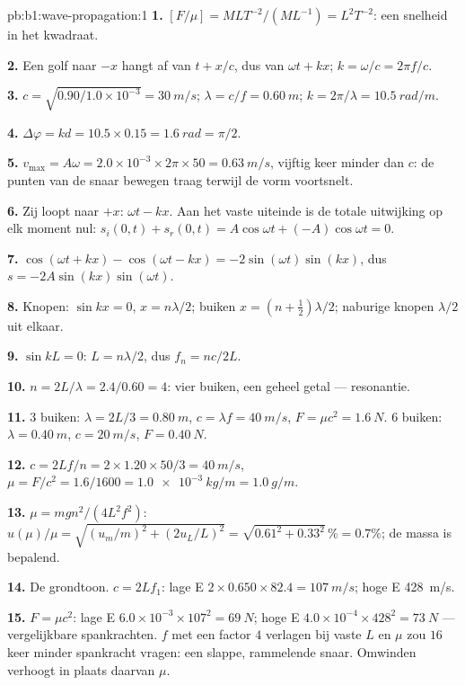 \begin{solution}{pb:b1:wave-propagation:1}
\textbf{1.} $[F/\mu] = M L T^{-2}/(M L^{-1}) = L^2 T^{-2}$: een snelheid in
het kwadraat.

\textbf{2.} Een golf naar $-x$ hangt af van $t + x/c$, dus van
$\omega t + kx$; $k = \omega/c = 2\pi f/c$.

\textbf{3.} $c = \sqrt{0.90/1.0\times10^{-3}} = \qty{30}{m/s}$;
$\lambda = c/f = \qty{0.60}{m}$; $k = 2\pi/\lambda = \qty{10.5}{rad/m}$.

\textbf{4.} $\Delta\varphi = kd = 10.5 \times 0.15 = \qty{1.6}{rad} = \pi/2$.

\textbf{5.} $v_{\max} = A\omega = 2.0\times10^{-3} \times 2\pi \times 50 =
\qty{0.63}{m/s}$, vijftig keer minder dan $c$: de punten van de snaar bewegen
traag terwijl de vorm voortsnelt.

\textbf{6.} Zij loopt naar $+x$:  $\omega t - kx$. Aan het vaste
uiteinde is de totale uitwijking op elk moment nul: $s_i(0, t) + s_r(0, t)
= A\cos\omega t + (-A)\cos\omega t = 0$.

\textbf{7.} $\cos(\omega t + kx) - \cos(\omega t - kx) =
-2\sin(\omega t)\sin(kx)$, dus $s = -2A\sin(kx)\sin(\omega t)$.

\textbf{8.} Knopen: $\sin kx = 0$, $x = n\lambda/2$; buiken $x = (n +
\tfrac12)\lambda/2$; naburige knopen $\lambda/2$ uit elkaar.

\textbf{9.} $\sin kL = 0$: $L = n\lambda/2$, dus $f_n = nc/2L$.

\textbf{10.} $n = 2L/\lambda = 2.4/0.60 = 4$: vier buiken, een geheel getal
--- resonantie.

\textbf{11.} $3$ buiken: $\lambda = 2L/3 = \qty{0.80}{m}$, $c = \lambda f
= \qty{40}{m/s}$, $F = \mu c^2 = \qty{1.6}{N}$. $6$ buiken: $\lambda =
\qty{0.40}{m}$, $c = \qty{20}{m/s}$, $F = \qty{0.40}{N}$.

\textbf{12.} $c = 2Lf/n = 2 \times 1.20 \times 50/3 = \qty{40}{m/s}$,
$\mu = F/c^2 = 1.6/1600 = \qty{1.0e-3}{kg/m} = \qty{1.0}{g/m}$.

\textbf{13.} $\mu = mgn^2/(4L^2f^2)$: $u(\mu)/\mu = \sqrt{(u_m/m)^2 +
(2u_L/L)^2} = \sqrt{0.61^2 + 0.33^2}\,\% = 0.7\%$; de massa is bepalend.

\textbf{14.} De grondtoon. $c = 2Lf_1$: lage E $2 \times 0.650 \times
82.4 = \qty{107}{m/s}$; hoge E \qty{428}{m/s}.

\textbf{15.} $F = \mu c^2$: lage E $6.0\times10^{-3} \times 107^2 =
\qty{69}{N}$; hoge E $4.0\times10^{-4} \times 428^2 = \qty{73}{N}$ ---
vergelijkbare spankrachten. $f$ met een factor $4$ verlagen bij vaste $L$ en $\mu$
zou $16$ keer minder spankracht vragen: een slappe, rammelende snaar. Omwinden
verhoogt in plaats daarvan $\mu$.


\end{solution}
